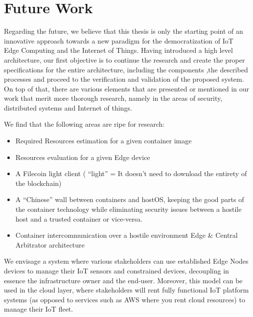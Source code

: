 \chapter{Future Work} \label{ch:future-work}

Regarding the future, we believe that this thesis is only the starting point of an innovative approach towards a new paradigm for the democratization of IoT Edge Computing and the Internet of Things. Having introduced a high level architecture, our first objective is to continue the research and create the proper specifications for the entire architecture, including the components ,the described processes and proceed to the verification and validation of the proposed system. On top of that, there are various elements that are presented or mentioned in our work that merit more thorough research, namely in the areas of security, distributed systems and Internet of things.

We find that the following areas are ripe for research:
\begin{itemize}
    \item Required Resources estimation for a given container image
    \item Resources evaluation for a given Edge device
    \item A Filecoin light client ( “light” = It doesn’t need to download the entirety of the blockchain)
    \item A “Chinese” wall between containers and hostOS, keeping the good parts of the container technology while eliminating security issues between a hostile host and a trusted container or 
    vice-versa.
    \item Container intercommunication over a hostile environment
    Edge \& Central Arbitrator architecture

\end{itemize}

We envisage a system where various stakeholders can use established Edge Nodes devices to manage their IoT sensors and constrained devices, decoupling in essence the infrastructure owner and the end-user. Moreover, this model can be used in the cloud layer, where stakeholders will rent fully functional IoT platform systems (as opposed to services such as AWS where you rent cloud resources) to manage their IoT fleet.

